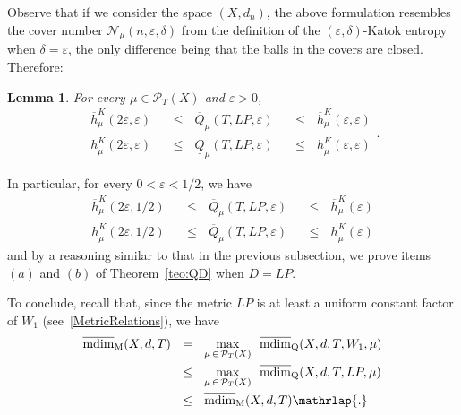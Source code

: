 \documentclass[11pt,a4paper,reqno]{amsart}
\theoremstyle{plain}
\newtheorem{lemma}[theorem]{Lemma}
\theoremstyle{definition}
\newcommand{\ep} {\varepsilon}
\newcommand{\vep}{\varepsilon}
\newcommand{\cP}{{\mathcal P}}
\begin{document}
Observe that if we consider the space $(X,d_n)$, the above formulation resembles the cover number $\mathcal{N}_\mu(n,\vep, \delta)$ from the definition of the $(\ep,\delta)$-Katok entropy when $\delta=\ep$, the only difference being that the balls in the covers are closed. Therefore:

\begin{lemma}\label{le:QK}
For every $\mu\in \cP_T(X)$ and $\ep>0$, 
\begin{equation*}
    \begin{alignedat}{2}
\overline{h}^K_\mu(2\ep,\ep)\,\,\,\,&\leq\,\,\,\,
\overline{Q}_\mu(T,LP,\ep) \,\,\,\,&\leq\,\,\,\, \overline{h}^K_\mu(\ep,\ep) \\\underline{h}^K_\mu(2\ep,\ep)\,\,\,\,&\leq\,\,\,\,\underline{Q}_\mu(T,LP,\ep) \,\,\,\,&\leq\,\,\,\, \underline{h}^K_\mu(\ep,\ep) 
    \end{alignedat}.
\end{equation*}
\end{lemma}


In particular, for every $0<\ep<1/2$, we have
\begin{equation*}
    \begin{alignedat}{2}
\overline{h}^K_\mu(2\ep,1/2)\,\,\,\,&\leq\,\,\,\,\overline{Q}_\mu(T,LP,\ep) \,\,\,\,&\leq\,\,\,\, \overline{h}^K_\mu(\ep) \\\underline{h}^K_\mu(2\ep,1/2)\,\,\,\,&\leq\,\,\,\,\overline{Q}_\mu(T,LP,\ep) \,\,\,\,&\leq\,\,\,\, \underline{h}^K_\mu(\ep) 
    \end{alignedat}
\end{equation*}
and by a reasoning similar to that in the previous subsection, we prove items $(a)$ and $(b)$ of Theorem~\ref{teo:QD} when $D=LP$. 
\smallskip

To conclude, recall that, since the metric $LP$ is at least a uniform constant factor of $W_1$ (see~\eqref{MetricRelations}), we have
\begin{equation}
    \begin{alignedat}{2}
        \mathrm{\overline{mdim}_M}(X,d,T)\,\,\,\, &=\,\,\,\, \max_{\mu\,\in\,\cP_T(X)}\,\, \,\mathrm{\overline{mdim}_Q}(X,d,T,W_1,\mu) 
    \\ & \leq\,\,\,\, \max_{\mu\,\in\,\cP_T(X)}\,\, \,\mathrm{\overline{mdim}_Q}(X,d,T,LP,\mu) 
     \\ & \leq\,\,\,\,\mathrm{\overline{mdim}_M}(X,d,T)
    \mathrlap{.}
    \end{alignedat}
\end{equation}
\end{document}
